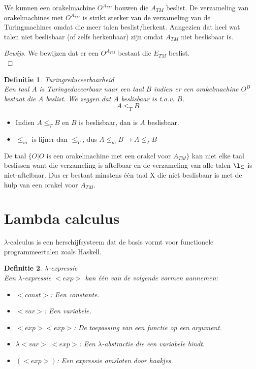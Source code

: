 \documentclass[a4paper]{article}
\newtheorem{tdefinitie}{Definitie}[section]
\newenvironment{definitie}[1]%
  {\begin{mdframed}[backgroundcolor=silver,
    topline=false,
    rightline=false,
    leftline=false,
    bottomline=false]\begin{tdefinitie}#1\\\normalfont}%
  {\end{tdefinitie}\end{mdframed}}
\newenvironment{bewijs}[1]%
  {\begin{mdframed}[topline=true,
    rightline=true,
    leftline=true,
    bottomline=true]\begin{proof}[Bewijs]#1\\[.2cm]\normalfont}%
  {\end{proof}\end{mdframed}}
\newcommand{\atm}{\ensuremath{{A_{TM}}}}
\newcommand{\etm}{\ensuremath{{E_{TM}}}}
\newcommand{\oatm}{\ensuremath{{O^\atm}}}
\begin{document}
We kunnen een orakelmachine $\oatm$ bouwen die $\atm$ beslist. De verzameling van orakelmachines met $\oatm$ is strikt sterker van de verzameling van de Turingmachines omdat die meer talen beslist/herkent. Aangezien dat heel wat talen niet beslisbaar (of zelfs herkenbaar) zijn omdat $\atm$ niet beslisbaar is.

\begin{bewijs}{We bewijzen dat er een $\oatm$ bestaat die $\etm$ beslist.}
  
\end{bewijs}

\begin{definitie}{Turingreduceerbaarheid}
  Een taal $A$ is Turingeduceerbaar naar een taal $B$ indien er een orakelmachine $O^B$ bestaat die $A$ beslist. We zeggen dat $A$ beslisbaar is t.o.v. $B$.
  \begin{equation*}
  A \leq_T B
  \end{equation*}
\end{definitie}

\begin{itemize}
\item Indien $A \leq_T B$ en $B$ is beslisbaar, dan is $A$ beslisbaar.
\item $\leq_m$ is fijner dan $\leq_T$, dus $A \leq_m B \rightarrow A \leq_T B$
\end{itemize}

De taal $\{O|O\text{ is een orakelmachine met een orakel voor }\atm\}$ kan niet elke taal beslissen want die verzameling is aftelbaar en de verzameling van alle talen $\l_\Sigma$ is niet-aftelbaar. Dus er bestaat minstens \'e\'en taal X die niet beslisbaar is met de hulp van een orakel voor $\atm$.


\newpage\section{Lambda calculus}

$\lambda$-calculus is een herschijfsysteem dat de basis vormt voor functionele programmeertalen zoals Haskell.

\begin{definitie}{$\lambda$-expressie}
  Een $\lambda$-expressie $<exp>$ kan \'e\'en van de volgende vormen aannemen:
  \begin{itemize}
  \item $<const>$: Een constante.
  \item $<var>$: Een variabele.
  \item $<exp> <exp>$: De toepassing van een functie op een argument.
  \item $\lambda<var>. <exp>$: Een $\lambda$-abstractie die een variabele bindt.
  \item $(<exp>)$: Een expressie omsloten door haakjes.
  \end{itemize}
\end{definitie}
\end{document}
